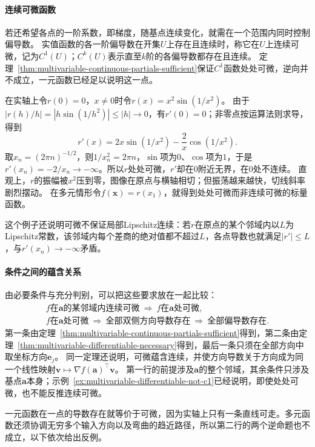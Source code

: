 \paragraph{连续可微函数}
若还希望各点的一阶系数，即梯度，随基点连续变化，就需在一个范围内同时控制偏导数。
实值函数的各一阶偏导数在开集$U$上存在且连续时，称它在$U$上连续可微，记为$C^1(U)$；$C^k(U)$表示直至$k$阶的各偏导数都存在且连续。
定理~\ref{thm:multivariable-continuous-partials-sufficient}保证$C^1$函数处处可微，逆向并不成立，一元函数已经足以说明这一点。
\begin{example}[处处可微而导数无界]
\label{ex:multivariable-differentiable-not-c1}
在实轴上令$r(0)=0$，$x\neq0$时令$r(x)=x^2\sin(1/x^2)$。
由于$|r(h)/h|=|h\sin(1/h^2)|\leq|h|\to0$，有$r'(0)=0$；非零点按运算法则求导，得到
\[
 r'(x)=2x\sin(1/x^2)-\frac{2}{x}\cos(1/x^2).
\]
取$x_n=(2\pi n)^{-1/2}$，则$1/x_n^2=2\pi n$，$\sin$项为$0$、$\cos$项为$1$，于是$r'(x_n)=-2/x_n\to-\infty$。所以$r$处处可微，$r'$却在$0$附近无界，在$0$处不连续。
直观上，$r$的振幅被$x^2$压到零，图像在原点与横轴相切；但振荡越来越快，切线斜率剧烈摆动。
在多元情形令$f(\bm x)=r(x_1)$，就得到处处可微而非连续可微的标量函数。
\end{example}

这个例子还说明可微不保证局部Lipschitz连续：若$r$在原点的某个邻域内以$L$为Lipschitz常数，该邻域内每个差商的绝对值都不超过$L$，各点导数也就满足$|r'|\leq L$，与$r'(x_n)\to-\infty$矛盾。

\paragraph{条件之间的蕴含关系}
由必要条件与充分判别，可以把这些要求放在一起比较：
\[
 \begin{gathered}
 f\text{在}\bm a\text{的某邻域内连续可微}
 \ \Longrightarrow\ f\text{在}\bm a\text{处可微},\\
 f\text{在}\bm a\text{处可微}
 \ \Longrightarrow\ \text{全部双侧方向导数存在}
 \ \Longrightarrow\ \text{全部偏导数存在}.
 \end{gathered}
\]
第一条由定理~\ref{thm:multivariable-continuous-partials-sufficient}得到，第二条由定理~\ref{thm:multivariable-differentiable-necessary}得到，最后一条只须在全部方向中取坐标方向$\bm e_j$。
同一定理还说明，可微蕴含连续，并使方向导数关于方向成为同一个线性映射$\bm v\mapsto\nabla f(\bm a)^\top\bm v$。
第一行的前提涉及$\bm a$的整个邻域，其余条件只涉及基点$\bm a$本身；示例~\ref{ex:multivariable-differentiable-not-c1}已经说明，即使处处可微，也不能反推连续可微。

一元函数在一点的导数存在就等价于可微，因为实轴上只有一条直线可走。多元函数还须协调无穷多个输入方向以及弯曲的趋近路径，所以第二行的两个逆命题也不成立，以下依次给出反例。

